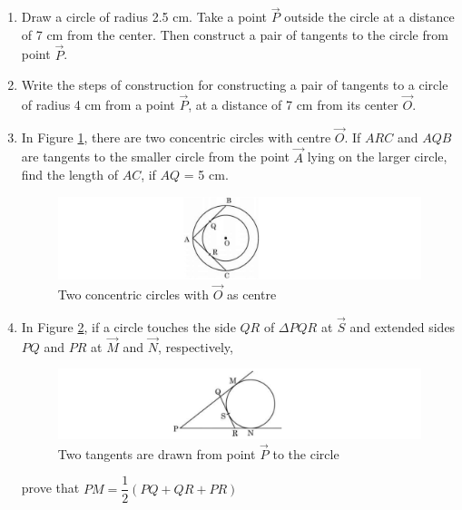 \begin{enumerate}[label=\thesection.\arabic*.,ref=\thesection.\theenumi]

	\item Draw a circle of radius 2.5 cm. Take a point $\vec{P}$ outside the circle at a distance of 7 cm from the center. Then construct a pair of tangents to the circle from point $\vec{P}$.

	\item Write the steps of construction for constructing a pair of tangents to a circle of radius 4 cm from a point $\vec{P}$, at a distance of 7 cm from its center $\vec{O}$.

	\item In Figure \ref{fig:tan1}, there are two concentric circles with centre $\vec{O}$. If $ARC$ and $AQB$ are tangents to the smaller circle  from the point $\vec{A}$ lying on the larger circle, find the length of $AC$, if $AQ$ = 5 cm.
		\begin{figure}[H]
			\centering
			\includegraphics[width=\columnwidth]{figs/tan}
			\caption{Two concentric circles with $\vec{O}$ as centre}
			\label{fig:tan1}
		\end{figure}
	
	\item In Figure \ref{fig:cir1}, if a circle touches the side $QR$ of $\Delta PQR$ at $\vec{S}$ and extended sides $PQ$ and $PR$ at $\vec{M}$ and $\vec{N}$, respectively,
		\begin{figure}[H]
			\centering
			\includegraphics[width=\columnwidth]{figs/cir}
				\caption{Two tangents are drawn from point $\vec{P}$ to the circle}
				\label{fig:cir1}
		\end{figure}
		prove that $PM=\dfrac{1}{2}(PQ+QR+PR)$


\end{enumerate}
